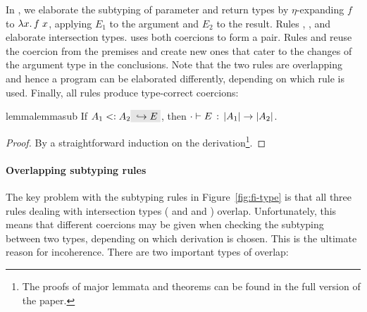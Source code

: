 In , we elaborate the subtyping of
parameter and return types by $\eta$-expanding $f$ to $\lamty x {\im {A_3}}
{\app f x}$, applying $E_1$ to the argument and $E_2$ to the result. Rules
, , and
 elaborate intersection types.
 uses both coercions to form a pair. Rules
 and  reuse the coercion
from the premises and create new ones that cater to the changes of the argument
type in the conclusions. Note that the two rules are overlapping and
hence a program can be elaborated differently, depending on which rule
is used. Finally, all rules produce type-correct coercions:



\begin{restatable}{lemma}{lemmasub}
  \label{lemma:sub}
  If $ A_1 \subtype A_2 \yields E $, then $ \jtype \cdot E {\im {A_1} \to \im {A_2}} $.
\end{restatable}

\begin{proof}
  By a straightforward induction on the derivation\footnote{The proofs of major lemmata and theorems can be found in the full version of the paper.}.
\end{proof}

\paragraph{Overlapping subtyping rules} The key problem with the
subtyping rules in Figure~\ref{fig:fi-type} is that all three rules dealing
with intersection types ( and
 and ) overlap.
Unfortunately, this means that different coercions may be given when checking
the subtyping between two types, depending on which derivation is chosen. This
is the ultimate reason for incoherence. There are two important types of
overlap:

